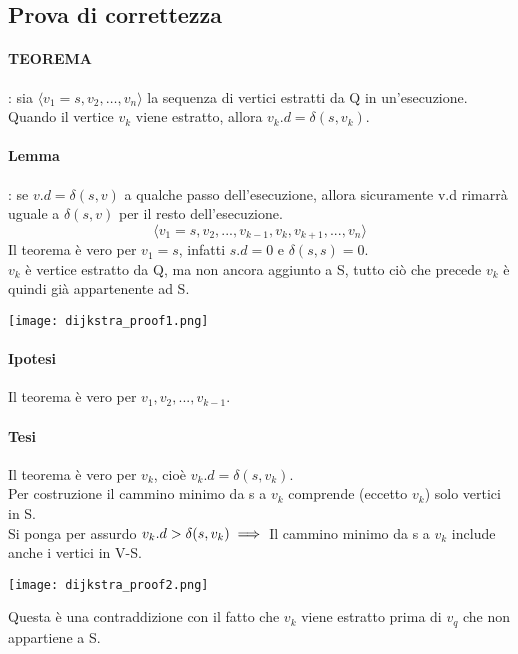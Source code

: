 \subsection{Prova di correttezza}
\paragraph*{TEOREMA}: sia $\langle v_1 = s,v_2,\dots,v_n \rangle$ la sequenza di vertici
estratti da Q in un'esecuzione. Quando il vertice $v_k$ viene estratto, allora $v_k.d = \delta
(s,v_k)$.
\paragraph*{Lemma}: se $v.d=\delta(s,v)$ a qualche passo dell'esecuzione, allora sicuramente
v.d rimarrà uguale a $\delta(s,v)$ per il resto dell'esecuzione.
\[ \langle v_1 = s,v_2,...,v_{k-1}, v_k, v_{k+1},...,v_n \rangle \]
Il teorema è vero per $v_1=s$, infatti $s.d = 0$ e $\delta(s,s) = 0$.\\
$v_k$ è vertice estratto da Q, ma non ancora aggiunto a S, tutto ciò che precede $v_k$ 
è quindi già appartenente ad S.
\begin{center}
    \texttt{[image: dijkstra\_proof1.png]}
\end{center}
\paragraph*{Ipotesi} Il teorema è vero per $v_1, v_2,..., v_{k-1}$.
\paragraph*{Tesi} Il teorema è vero per $v_k$, cioè $v_k.d=\delta(s,v_k)$.\\
Per costruzione il cammino minimo da s a $v_k$ comprende (eccetto $v_k$) solo vertici in S.\\
Si ponga per assurdo $v_k.d > \delta(s,v_k)\\
\implies$ Il cammino minimo da s a $v_k$ include anche i vertici in V-S.
\begin{center}
    \texttt{[image: dijkstra\_proof2.png]}
\end{center}
Questa è una contraddizione con il fatto che $v_k$ viene estratto prima di $v_q$ che non appartiene
a S.